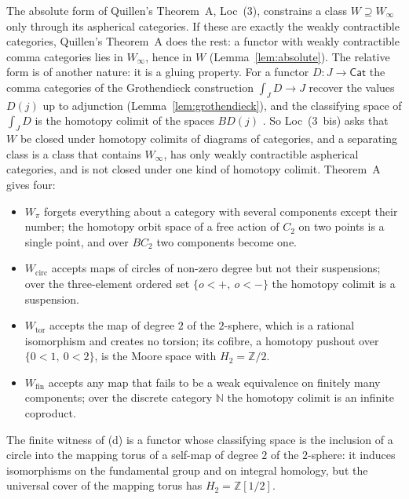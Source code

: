 \documentclass[11pt,a4paper]{article}
\theoremstyle{definition}
\newcommand{\Cat}{\mathsf{Cat}}
\newcommand{\Winf}{W_{\infty}}
\newcommand{\Wpi}{W_{\pi}}
\newcommand{\Wcirc}{W_{\mathrm{circ}}}
\newcommand{\Wtor}{W_{\mathrm{tor}}}
\newcommand{\Wfin}{W_{\mathrm{fin}}}
\newcommand{\Z}{\mathbb{Z}}
\newcommand{\N}{\mathbb{N}}
\begin{document}
The absolute form of Quillen's Theorem~A, Loc~(3), constrains a class $W\supseteq\Winf$ only through its
aspherical categories. If these are exactly the weakly contractible categories, Quillen's
Theorem~A does the rest: a functor with weakly contractible comma categories lies in $\Winf$,
hence in $W$ (Lemma~\ref{lem:absolute}). The relative form is of another nature: it is a
gluing property. For a functor $D\colon J\to\Cat$ the comma categories of the Grothendieck
construction $\int_J D\to J$ recover the values $D(j)$ up to adjunction
(Lemma~\ref{lem:grothendieck}), and the classifying space of $\int_J D$ is the homotopy colimit
of the spaces $BD(j)$ \cite{Tho79}. So Loc~(3~bis) asks that $W$ be closed under homotopy
colimits of diagrams of categories, and a separating class is a class that contains $\Winf$,
has only weakly contractible aspherical categories, and is not closed under one kind of
homotopy colimit. Theorem~A gives four:
\begin{itemize}
\item[(a)] $\Wpi$ forgets everything about a category with several components except their
number; the homotopy orbit space of a free action of $C_2$ on two points is a single point, and
over $BC_2$ two components become one.
\item[(b)] $\Wcirc$ accepts maps of circles of non-zero degree but not their suspensions; over
the three-element ordered set $\{o<+,\ o<-\}$ the homotopy colimit is a suspension.
\item[(c)] $\Wtor$ accepts the map of degree $2$ of the $2$-sphere, which is a rational
isomorphism and creates no torsion; its cofibre, a homotopy pushout over $\{0<1,\ 0<2\}$, is
the Moore space with $H_2=\Z/2$.
\item[(d)] $\Wfin$ accepts any map that fails to be a weak equivalence on finitely many
components; over the discrete category $\N$ the homotopy colimit is an infinite coproduct.
\end{itemize}
The finite witness of (d) is a functor whose classifying space is the inclusion of a circle
into the mapping torus of a self-map of degree $2$ of the $2$-sphere: it induces isomorphisms on the fundamental group and on integral
homology, but the universal cover of the mapping torus has $H_2=\Z[1/2]$.
\end{document}
